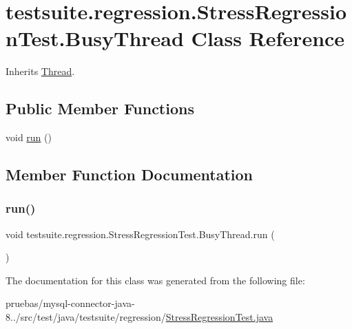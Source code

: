 \hypertarget{classtestsuite_1_1regression_1_1_stress_regression_test_1_1_busy_thread}{}\section{testsuite.\+regression.\+Stress\+Regression\+Test.\+Busy\+Thread Class Reference}
\label{classtestsuite_1_1regression_1_1_stress_regression_test_1_1_busy_thread}


Inherits \mbox{\hyperlink{class_thread}{Thread}}.

\subsection*{Public Member Functions}
\begin{DoxyCompactItemize}
\item 
void \mbox{\hyperlink{classtestsuite_1_1regression_1_1_stress_regression_test_1_1_busy_thread_a2915a9211f51eddf7bdd522a7c285a97}{run}} ()
\end{DoxyCompactItemize}


\subsection{Member Function Documentation}
\mbox{\label{classtestsuite_1_1regression_1_1_stress_regression_test_1_1_busy_thread_a2915a9211f51eddf7bdd522a7c285a97}} 
\subsubsection{\texorpdfstring{run()}{run()}}
{\footnotesize\ttfamily void testsuite.\+regression.\+Stress\+Regression\+Test.\+Busy\+Thread.\+run (\begin{DoxyParamCaption}{ }\end{DoxyParamCaption})}



The documentation for this class was generated from the following file\+:\begin{DoxyCompactItemize}
\item 
pruebas/mysql-\/connector-\/java-\/8../src/test/java/testsuite/regression/\mbox{\hyperlink{_stress_regression_test_8java}{Stress\+Regression\+Test.\+java}}\end{DoxyCompactItemize}
